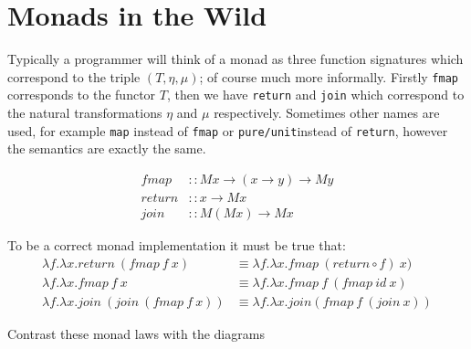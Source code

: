 \documentclass[a4paper,10pt]{article}
\theoremstyle{definition}
\begin{document}
\pagebreak
\section{Monads in the Wild}
Typically a programmer will think of a monad as three function signatures
which correspond to the triple $(T,\eta,\mu)$;
of course much more informally.
Firstly \texttt{fmap} corresponds to the functor $T$,
then we have \texttt{return} and \texttt{join} which correspond to
the natural transformations $\eta$ and $\mu$ respectively.
Sometimes other names are used,
for example \texttt{map} instead of \texttt{fmap}
or \texttt{pure/unit}instead of \texttt{return},
however the semantics are exactly the same.

\begin{equation}
  \begin{split}
    fmap   &:: M x \rightarrow (x \rightarrow y) \rightarrow M y \\
    return &:: x \rightarrow M x                                 \\
    join   &:: M (M x) \rightarrow M x
  \end{split}
\end{equation}

To be a correct monad implementation it must be true that:
\begin{equation}
  \begin{split}
      \lambda f.\lambda x.return\ (fmap\ f\ x)
      &\equiv
      \lambda f.\lambda x.fmap\ (return \circ f)\ x)
      \\
      \lambda f.\lambda x.fmap\ f\ x
      &\equiv
      \lambda f.\lambda x.fmap\ f\ (fmap\ id\ x)
      \\
      \lambda f.\lambda x.join\ (join\ (fmap\ f\ x))
      &\equiv
      \lambda f.\lambda x.join(fmap\ f\ (join\ x))
  \end{split}
\end{equation}

Contrast these monad laws with the diagrams
\begin{center}
    \quad
\end{center}
\end{document}
